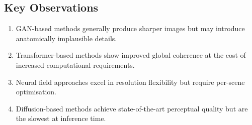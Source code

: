 \subsection{Key Observations}

\begin{enumerate}
  \item GAN-based methods generally produce sharper images but may introduce anatomically implausible details.
  \item Transformer-based methods show improved global coherence at the cost of increased computational requirements.
  \item Neural field approaches excel in resolution flexibility but require per-scene optimisation.
  \item Diffusion-based methods achieve state-of-the-art perceptual quality but are the slowest at inference time.
\end{enumerate}

